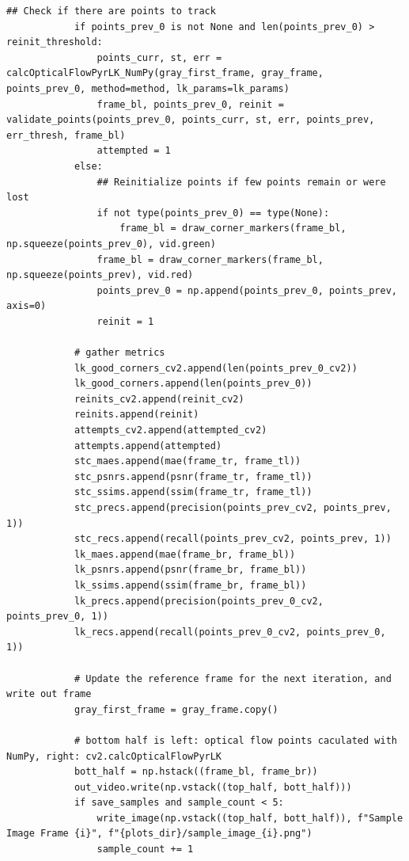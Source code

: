 \documentclass[11pt, conference, letterpaper]{IEEEtran}
\begin{document}
\begin{lstlisting}[style=python, caption={\texttt{lucas\_kanade.py}}, label={lst:lk}]
            ## Check if there are points to track
            if points_prev_0 is not None and len(points_prev_0) > reinit_threshold:
                points_curr, st, err = calcOpticalFlowPyrLK_NumPy(gray_first_frame, gray_frame, points_prev_0, method=method, lk_params=lk_params)
                frame_bl, points_prev_0, reinit = validate_points(points_prev_0, points_curr, st, err, points_prev, err_thresh, frame_bl)
                attempted = 1
            else:
                ## Reinitialize points if few points remain or were lost
                if not type(points_prev_0) == type(None):
                    frame_bl = draw_corner_markers(frame_bl, np.squeeze(points_prev_0), vid.green)
                frame_bl = draw_corner_markers(frame_bl, np.squeeze(points_prev), vid.red)
                points_prev_0 = np.append(points_prev_0, points_prev, axis=0)
                reinit = 1
            
            # gather metrics
            lk_good_corners_cv2.append(len(points_prev_0_cv2))
            lk_good_corners.append(len(points_prev_0))
            reinits_cv2.append(reinit_cv2)
            reinits.append(reinit)
            attempts_cv2.append(attempted_cv2)
            attempts.append(attempted)
            stc_maes.append(mae(frame_tr, frame_tl))
            stc_psnrs.append(psnr(frame_tr, frame_tl))
            stc_ssims.append(ssim(frame_tr, frame_tl))
            stc_precs.append(precision(points_prev_cv2, points_prev, 1))
            stc_recs.append(recall(points_prev_cv2, points_prev, 1))
            lk_maes.append(mae(frame_br, frame_bl))
            lk_psnrs.append(psnr(frame_br, frame_bl))
            lk_ssims.append(ssim(frame_br, frame_bl))
            lk_precs.append(precision(points_prev_0_cv2, points_prev_0, 1))
            lk_recs.append(recall(points_prev_0_cv2, points_prev_0, 1))
            
            # Update the reference frame for the next iteration, and write out frame
            gray_first_frame = gray_frame.copy()
            
            # bottom half is left: optical flow points caculated with NumPy, right: cv2.calcOpticalFlowPyrLK
            bott_half = np.hstack((frame_bl, frame_br))
            out_video.write(np.vstack((top_half, bott_half)))
            if save_samples and sample_count < 5:
                write_image(np.vstack((top_half, bott_half)), f"Sample Image Frame {i}", f"{plots_dir}/sample_image_{i}.png")
                sample_count += 1
                

\end{lstlisting}
\end{document}
